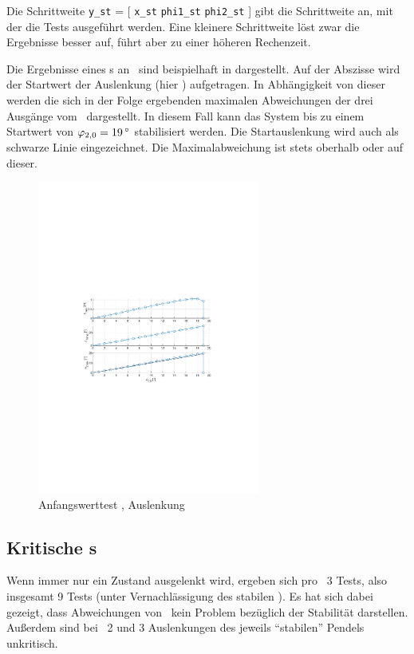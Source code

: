 Die Schrittweite \texttt{y\_st} = [ \texttt{x\_st} \texttt{phi1\_st} \texttt{phi2\_st} ] gibt die Schrittweite an, mit der die Tests ausgeführt werden.
Eine kleinere Schrittweite löst zwar die Ergebnisse besser auf, führt aber zu einer höheren Rechenzeit.

Die Ergebnisse eines \xots s an \apv\ sind beispielhaft in  dargestellt.
Auf der Abszisse wird der Startwert der Auslenkung (hier \phz) aufgetragen.
In Abhängigkeit von dieser werden die sich in der Folge ergebenden maximalen Abweichungen der drei Ausgänge vom \ap\ dargestellt.
In diesem Fall kann das System bis zu einem Startwert von $\phzo=\valdeg{19}$ stabilisiert werden.
Die Startauslenkung wird auch als schwarze Linie eingezeichnet. 
Die Maximalabweichung ist stets oberhalb oder auf dieser.

\begin{figure}[htbp]
	\centering
		\includegraphics[width=0.65\textwidth]{Bilder/x0test/appr-x0-ap42.pdf}
	\caption{Anfangswerttest \apv, Auslenkung \phz}
	\label{fig:x0test}
\end{figure}


\subsection{Kritische \xots s}\label{subsec:xotskrit}

Wenn immer nur ein Zustand ausgelenkt wird, ergeben sich pro \ap\ 3 Tests, also insgesamt 9 Tests (unter Vernachlässigung des stabilen \ape).
Es hat sich dabei gezeigt, dass Abweichungen von \xo\ kein Problem bezüglich der Stabilität darstellen.
Außerdem sind bei \ap\ 2 und 3 Auslenkungen des jeweils "`stabilen"' Pendels unkritisch.

